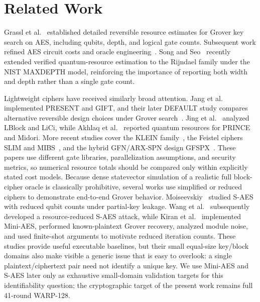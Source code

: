 \documentclass[pdflatex,sn-nature]{sn-jnl}
\theoremstyle{thmstyleone}
\theoremstyle{thmstyletwo}
\begin{document}
\section{Related Work}
Grassl et al.~\cite{Grassl2016} established detailed reversible resource estimates for Grover key search on AES, including qubits, depth, and logical gate counts. Subsequent work refined AES circuit costs and oracle engineering~\cite{Langenberg2020,Jaques2020,Lin2023}. Song and Seo~\cite{SongSeo2026} recently extended verified quantum-resource estimation to the Rijndael family under the NIST MAXDEPTH model, reinforcing the importance of reporting both width and depth rather than a single gate count.

Lightweight ciphers have received similarly broad attention. Jang et al.~\cite{Jang2021} implemented PRESENT and GIFT, and their later DEFAULT study compares alternative reversible design choices under Grover search~\cite{JangDefault2025}. Jing et al.~\cite{Jing2023} analyzed LBlock and LiCi, while Akhlaq et al.~\cite{Akhlaq2024} reported quantum resources for PRINCE and Midori. More recent studies cover the KLEIN family~\cite{KLEIN2026}, the Feistel ciphers SLIM and MIBS~\cite{SLIM2025,MIBS2026}, and the hybrid GFN/ARX-SPN design GFSPX~\cite{Ulgen2026}. These papers use different gate libraries, parallelization assumptions, and security metrics, so numerical resource totals should be compared only within explicitly stated cost models.
Because dense statevector simulation of a realistic full block-cipher oracle is classically prohibitive, several works use simplified or reduced ciphers to demonstrate end-to-end Grover behavior. Moiseevskiy~\cite{Moiseevskiy2023} studied S-AES with reduced qubit counts under partial-key leakage. Wang et al.~\cite{Wang2025} subsequently developed a resource-reduced S-AES attack, while Kiran et al.~\cite{Kiran2026} implemented Mini-AES, performed known-plaintext Grover recovery, analyzed module noise, and used finite-shot arguments to motivate reduced iteration counts.  These studies provide useful executable baselines, but their small equal-size key/block domains also make visible a generic issue that is easy to overlook: a single plaintext/ciphertext pair need not identify a unique key.  We use Mini-AES and S-AES later only as exhaustive small-domain validation targets for this identifiability question; the cryptographic target of the present work remains full 41-round WARP-128.
\end{document}
